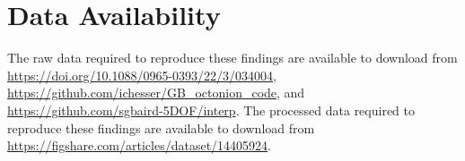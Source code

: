 \documentclass[final,twocolumn,12pt]{elsarticle}
\begin{document}
\begin{appendices}

\end{appendices}

\section*{Data Availability}
The raw data required to reproduce these findings are available to download from \url{https://doi.org/10.1088/0965-0393/22/3/034004}, \url{https://github.com/ichesser/GB_octonion_code}, and \url{https://github.com/sgbaird-5DOF/interp}. The processed data required to reproduce these findings are available to download from \url{https://figshare.com/articles/dataset/14405924}.




% 
\end{document}
